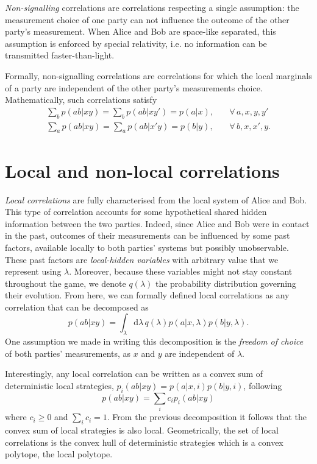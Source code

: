 \textit{Non-signalling} correlations are correlations respecting a single assumption: the measurement choice of one party can not influence the outcome of the other party's measurement.
When Alice and Bob are space-like separated, this assumption is enforced by special relativity, i.e. no information can be transmitted faster-than-light.

Formally, non-signalling correlations are correlations for which the local marginals of a party are independent of the other party's measurements choice. 
Mathematically, such correlations satisfy
\begin{align}
	\sum_b p(ab|xy) = \sum_b p(ab|xy') = p(a|x), \quad &\forall\,a,x,y,y' \\
	\sum_a p(ab|xy) = \sum_a p(ab|x'y) = p(b|y), \quad &\forall\,b,x,x',y.
	\label{eq:non-signalling}
\end{align}


\section{Local and non-local correlations}

\textit{Local correlations} are fully characterised from the local system of Alice and Bob.
This type of correlation accounts for some hypothetical shared hidden information between the two parties.
Indeed, since Alice and Bob were in contact in the past, outcomes of their measurements can be influenced by some past factors, available locally to both parties' systems but possibly unobservable.
These past factors are \textit{local-hidden variables} with arbitrary value that we represent using $\lambda$.
Moreover, because these variables might not stay constant throughout the game, we denote $q(\lambda)$ the probability distribution governing their evolution. 
From here, we can formally defined local correlations as any correlation that can be decomposed as
\begin{equation}
	p(ab|xy) = \int_\lambda \mathrm{d}\lambda \, q(\lambda) p(a|x,\lambda) p(b|y,\lambda).
	\label{eq:local}
\end{equation}
One assumption we made in writing this decomposition is the \textit{freedom of choice} of both parties' measurements, as $x$ and $y$ are independent of $\lambda$.

Interestingly, any local correlation can be written as a convex sum of deterministic local strategies, $p_i(ab|xy)=p(a|x,i)p(b|y,i)$, following
\begin{equation}
	p(ab|xy) = \sum_i c_i p_i(ab|xy)
	\label{eq:polytope}
\end{equation}
where $c_i\geq 0$ and $\sum_i c_i = 1$.
From the previous decomposition it follows that the convex sum of local strategies is also local. 
Geometrically, the set of local correlations is the convex hull of deterministic strategies which is a convex polytope, the local polytope.

